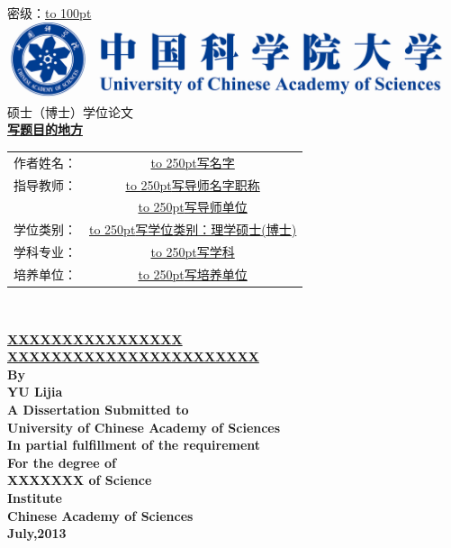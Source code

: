 \documentclass[a4paper,12pt,oneside,openany]{book}
\newcommand{\SIH}{\fontsize{14.05}{16.86}\selectfont}%
\newcommand{\SAN}{\fontsize{16.06}{19.27}\selectfont}%
\newcommand{\YI}{\fontsize{26.10}{31.32}\selectfont}%
\begin{document}
 

\pagestyle{plain}
\thispagestyle{empty}

	\begin{center}
	\hfill{\LARGE 密级：\underline{\hbox to 100pt{\hfill \hfill}}}
	\\[8ex]
	\includegraphics[scale=0.105]{fig/2.png}\\[5em]
	{\YI 硕士（博士）学位论文}\\[5em]
	\bf
	{\SAN\underline{写题目的地方}}\\[5em]
		\begin{tabular}{cc}
			\SIH 作者姓名： &\underline{\hbox to 250pt{\SIH 写名字}}\\[1em]
		  	\SIH 指导教师： &	\underline{\hbox to 250pt{\SIH 写导师名字职称}}\\[1em]
		  			      &\underline{\hbox to 250pt{\SIH 写导师单位}}\\[1em]
			\SIH 学位类别： &	\underline{\hbox to 250pt{\SIH 写学位类别：理学硕士(博士)\hfill}}\\[1em]
			\SIH 学科专业： &	\underline{\hbox to 250pt{\SIH 写学科}}\\[1em]
			\SIH 培养单位： &	\underline{\hbox to 250pt{\SIH 写培养单位}}\\
		\end{tabular} 
	\\[20ex]  
	\end{center}

\clearpage
\newpage
\thispagestyle{empty}

	\begin{center}
	\vspace*{20pt}
	{\bf\SAN\underline{XXXXXXXXXXXXXXXX}\\[1em]\underline{XXXXXXXXXXXXXXXXXXXXXXX}}\\[9em]
	\bf\SAN
	By \\
	YU Lijia\\[6em]
	\bf\SIH
	A Dissertation Submitted to \\
	University of Chinese Academy of Sciences\\
	In partial fulfillment of the requirement \\
	For the degree of \\
	XXXXXXX of Science\\[5em]
	Institute\\ Chinese Academy of Sciences\\[2em]
	{\SIH July,2013}
	\end{center}
\end{document}
